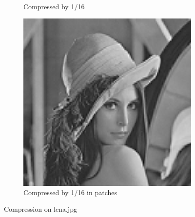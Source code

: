 \documentclass{article}
\begin{document}
\begin{figure}[htb!]
\begin{subfigure}[t]{0.25\textwidth}
			\caption{\label{fig:lena-compress-16}Compressed by 1/16}
		\end{subfigure}
		\hfill
		\begin{subfigure}[t]{0.25\textwidth}
			\centering
			\includegraphics[width=\textwidth]{img/lena_patches_compress.jpg}
			\caption{\label{fig:lena-patch-compress}Compressed by 1/16 in patches}
		\end{subfigure}
		\caption{\label{fig:q1-1}Compression on lena.jpg}
	\end{figure}
\end{document}
